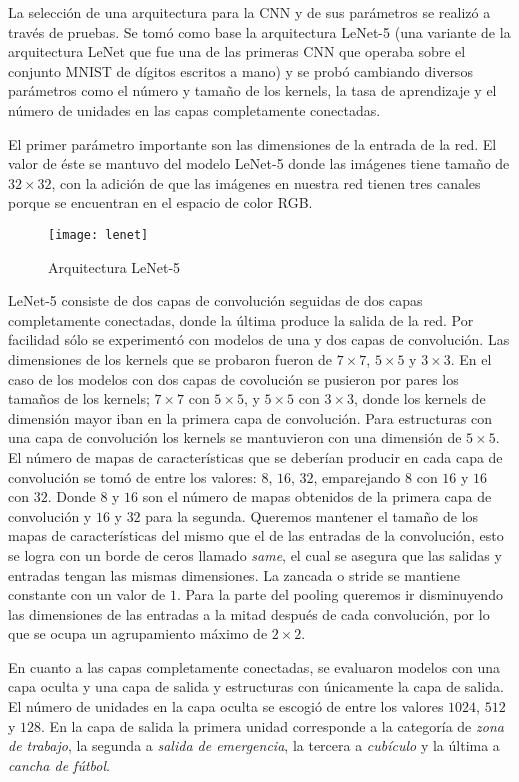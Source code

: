 La selección de una arquitectura para la CNN y de sus parámetros se
realizó a través de pruebas. Se tomó como base 
la arquitectura LeNet-5 (una variante de la arquitectura LeNet  que fue una de las primeras CNN que operaba sobre el 
conjunto MNIST de dígitos escritos a mano) y se probó cambiando
diversos parámetros como el número y tamaño de los kernels, la tasa de aprendizaje y el número de unidades en las capas completamente conectadas.

El primer parámetro importante son las dimensiones de
la entrada de la red. El valor de éste se mantuvo del
modelo LeNet-5 donde las imágenes tiene tamaño de $32 \times 32$,
con la adición de que las imágenes en nuestra red
tienen tres canales porque se encuentran en el espacio de 
color RGB.

\begin{figure}[!ht]
\centering
\caption{Arquitectura LeNet-5}
\texttt{[image: lenet]}
\end{figure}

LeNet-5 consiste de dos capas de convolución seguidas de dos
capas completamente conectadas, donde la última produce
la salida de la red.
Por facilidad sólo se experimentó con modelos de una y dos capas
de convolución. Las dimensiones de los kernels  que se probaron fueron de 
$7 \times 7$,
$5 \times 5$ y $3 \times 3$. En el caso de los modelos con
dos capas de covolución se pusieron por pares los tamaños de
los kernels; $7 \times 7$ con
$5 \times 5$, y $5 \times 5$ con $3 \times 3$, donde los kernels
de dimensión mayor iban en la primera capa de convolución.
Para estructuras con una capa de convolución los kernels
se mantuvieron con una dimensión de $5 \times 5$.
El número de mapas de características que se deberían producir
en cada capa de convolución se tomó de entre los valores: $8$, 
$16$, $32$, emparejando $8$ con $16$ y $16$ con $32$.
Donde $8$ y $16$ son el número de mapas obtenidos de la primera 
capa de convolución y $16$ y $32$ para la segunda.
Queremos mantener el tamaño de los mapas de
características del mismo que el de las entradas de la convolución,
esto se logra con un borde de ceros llamado \textit{same}, 
el cual se asegura que las salidas y entradas tengan las mismas dimensiones. 
La zancada o stride se mantiene constante con un valor de $1$.
Para la parte del pooling queremos ir disminuyendo las 
dimensiones de las entradas a la mitad después de cada
convolución, por lo que se ocupa un agrupamiento máximo 
de $2 \times 2$.


En cuanto a las capas completamente conectadas, se evaluaron
modelos con una capa oculta y una capa de salida y estructuras
con únicamente la capa de salida. El número de unidades 
en la capa oculta se escogió de entre los valores $1024$,
$512$ y $128$. En la capa de salida la primera unidad corresponde a la
categoría de \textit{zona de trabajo}, la segunda a 
\textit{salida de emergencia}, la tercera a \textit{cubículo}
y la última a \textit{cancha de fútbol}.

